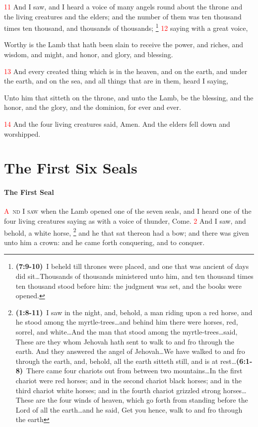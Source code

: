 \documentclass[12pt,twoside]{memoir}
\newcommand{\cbibleref}[3]{\textbf{\ibibleverse{#1}(#2)}\ {#3}}
\newcommand{\cbiblechvs}[3]{\textbf{\ibiblechvs{#1}(#2)}\ {#3}}
\newcommand{\cbiblefoot}[3]{\footnote{\cbibleref{#1}{#2}{#3}}}
\newcommand{\cbiblefootduosb}[5]{\footnote{\cbibleref{#1}{#2}{#3}\ldots \cbiblechvs{#1}{#4}{#5}}} %
\newcommand{\vnum}[1]{\textcolor{red}{\normalsize{#1}}}
\begin{document}
\vnum{11} And I saw, and I heard a voice of many angels round about the throne and the living creatures and the elders; and the number of them was ten thousand times ten thousand, and thousands of thousands;%
	\cbiblefoot{Daniel}{7:9-10}{I beheld till thrones were placed, and one that was ancient of days did sit\ldots Thousands of thousands ministered unto him, and ten thousand times ten thousand stood before him: the judgment was set, and the books were opened.}
\vnum{12} saying with a great voice,

Worthy is the Lamb that hath been slain to receive the power, and riches, and wisdom, and might, and honor, and glory, and blessing.

\vnum{13} And every created thing which is in the heaven, and on the earth, and under the earth, and on the sea, and all things that are in them, heard I saying,

Unto him that sitteth on the throne, and unto the Lamb, be the blessing, and the honor, and the glory, and the dominion, for ever and ever.

\vnum{14} And the four living creatures said, Amen. And the elders fell down and worshipped.


\chapter{The First Six Seals}
\subsubsection*{The First Seal}
\lettrine[lines=3]{\textcolor{red}{A}}{\ nd I saw} when the Lamb opened one of the seven seals, and I heard one of the four living creatures saying as with a voice of thunder, Come. 
\vnum{2} And I saw, and behold, a white horse,%
	\cbiblefootduosb{Zechariah}{1:8-11}{I saw in the night, and, behold, a man riding upon a red horse, and he stood among the myrtle-trees\ldots and behind him there were horses, red, sorrel, and white\ldots And the man that stood among the myrtle-trees\ldots said, These are they whom Jehovah hath sent to walk to and fro through the earth. And they answered the angel of Jehovah\ldots We have walked to and fro through the earth, and, behold, all the earth sitteth still, and is at rest}%
					{6:1-8}{There came four chariots out from between two mountains\ldots In the first chariot were red horses; and in the second chariot black horses; and in the third chariot white horses; and in the fourth chariot grizzled strong horses\ldots These are the four winds of heaven, which go forth from standing before the Lord of all the earth\ldots and he said, Get you hence, walk to and fro through the earth}
 and he that sat thereon had a bow; and there was given unto him a crown: and he came forth conquering, and to conquer.
\end{document}
